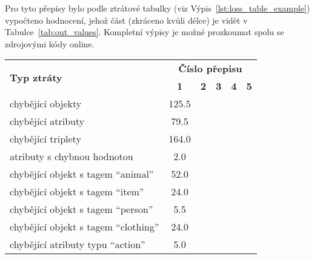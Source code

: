 Pro tyto přepisy bylo podle ztrátové tabulky (viz Výpis~\ref{lst:loss_table_example}) vypočteno hodnocení, jehož část (zkráceno kvůli délce) je vidět v Tabulce~\ref{tab:out_values}.
Kompletní výpisy je možné prozkoumat spolu se zdrojovými kódy online.
\begin{table}[ht!]
	\centering
	\begin{tabular}{|l|c|c|c|c|c|}
		\hline
		\multirow{2}{*}{\textbf{Typ ztráty}}                & \multicolumn{5}{c|}{\textbf{Číslo přepisu}}                                                     \\
		\cline{2-6}
		                                                    & \textbf{1}                                  & \textbf{2} & \textbf{3} & \textbf{4} & \textbf{5} \\
		\hline
		chybějící objekty                                   & 125.5                                       &            &            &            &            \\
		chybějící atributy                                  & 79.5                                        &            &            &            &            \\
		chybějící triplety                                  & 164.0                                       &            &            &            &            \\
		atributy s chybnou hodnotou                         & 2.0                                         &            &            &            &            \\
		\hline
		chybějící objekt s tagem \enquote{animal}           & 52.0                                        &            &            &            &            \\
		chybějící objekt s tagem \enquote{item}             & 24.0                                        &            &            &            &            \\
		chybějící objekt s tagem \enquote{person}           & 5.5                                         &            &            &            &            \\
		chybějící objekt s tagem \enquote{clothing}         & 24.0                                        &            &            &            &            \\
		\hline
		chybějící atributy typu \enquote{action}            & 5.0                                         &            &            &            &            \\

\end{tabular}
\end{table}
